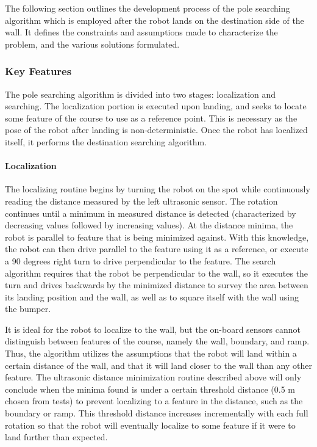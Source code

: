 \documentclass[ece]{uw-wkrpt}
\begin{document}
The following section outlines the development process of the pole searching algorithm which is employed after the robot lands on the destination side of the wall. It defines the constraints and assumptions made to characterize the problem, and the various solutions formulated. 

\subsubsection{Key Features}

The pole searching algorithm is divided into two stages: localization and searching. The localization portion is executed upon landing, and seeks to locate some feature of the course to use as a reference point. This is necessary as the pose of the robot after landing is non-deterministic. Once the robot has localized itself, it performs the destination searching algorithm. 

\paragraph{Localization}

The localizing routine begins by turning the robot on the spot while continuously reading the distance measured by the left ultrasonic sensor. The rotation continues until a minimum in measured distance is detected (characterized by decreasing values followed by increasing values). At the distance minima, the robot is parallel to feature that is being minimized against. With this knowledge, the robot can then drive parallel to the feature using it as a reference, or execute a 90 degrees right turn to drive perpendicular to the feature. The search algorithm requires that the robot be perpendicular to the wall, so it executes the turn and drives backwards by the minimized distance to survey the area between its landing position and the wall, as well as to square itself with the wall using the bumper. 

It is ideal for the robot to localize to the wall, but the on-board sensors cannot distinguish between features of the course, namely the wall, boundary, and ramp. Thus, the algorithm utilizes the assumptions that the robot will land within a certain distance of the wall, and that it will land closer to the wall than any other feature. The ultrasonic distance minimization routine described above will only conclude when the minima found is under a certain threshold distance (0.5 m chosen from tests) to prevent localizing to a feature in the distance, such as the boundary or ramp. This threshold distance increases incrementally with each full rotation so that the robot will eventually localize to some feature if it were to land further than expected. 
\end{document}
